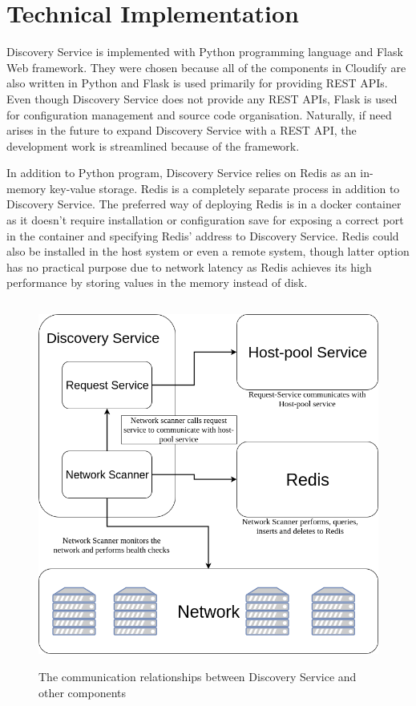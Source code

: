 \section{Technical Implementation}

Discovery Service is implemented with Python programming language and Flask Web framework. They were chosen because all of the components in Cloudify are also written in Python and Flask is used primarily for providing REST APIs. Even though Discovery Service does not provide any REST APIs, Flask is used for configuration management and source code organisation. Naturally, if need arises in the future to expand Discovery Service with a REST API, the development work is streamlined because of the framework.

In addition to Python program, Discovery Service relies on Redis \cite{Redis} as an in-memory key-value storage. Redis is a completely separate process in addition to Discovery Service. The preferred way of deploying Redis is in a docker container as it doesn't require installation or configuration save for exposing a correct port in the container and specifying Redis' address to Discovery Service. Redis could also be installed in the host system or even a remote system, though latter option has no practical purpose due to network latency as Redis achieves its high performance by storing values in the memory instead of disk.

\begin{figure}[ht!]
\centering
  \includegraphics[width=12cm,height=12cm, keepaspectratio]{Discovery-service-communication.png}
  \caption{The communication relationships between Discovery Service and other components}
  \label{fig:communications}
\end{figure}

